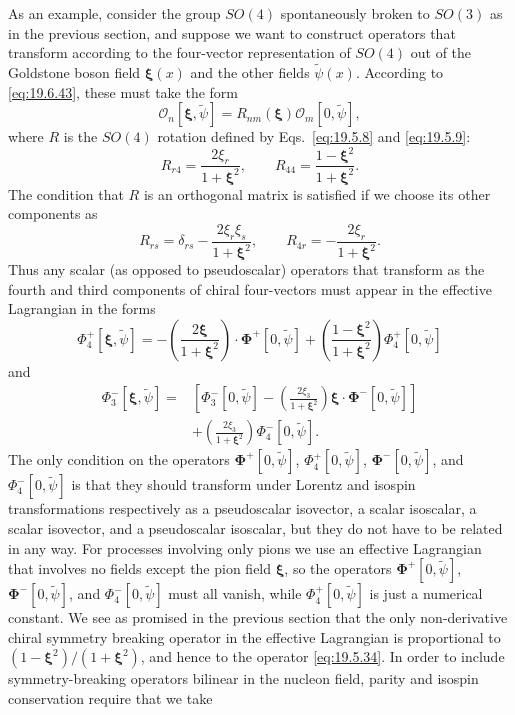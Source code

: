 As an example, consider the group $SO(4)$ spontaneously broken to $SO(3)$ as in the previous section, and suppose we want to construct operators that transform according to the four-vector representation of $SO(4)$ out of the Goldstone boson field $\boldsymbol\xi(x)$ and the other fields $\widetilde\psi(x)$. According to \eqref{eq:19.6.43}, these must take the form
\[
\mathcal O_n[\boldsymbol\xi,\widetilde\psi]
=R_{nm}(\boldsymbol\xi)\mathcal O_m[0,\widetilde\psi],
\]
where $R$ is the $SO(4)$ rotation defined by Eqs.~\eqref{eq:19.5.8} and \eqref{eq:19.5.9}:
\[
R_{r4}=\frac{2\xi_r}{1+\boldsymbol\xi^2},
\qquad
R_{44}=\frac{1-\boldsymbol\xi^2}{1+\boldsymbol\xi^2}.
\]
The condition that $R$ is an orthogonal matrix is satisfied if we choose its other components as
\[
R_{rs}=\delta_{rs}
-\frac{2\xi_r\xi_s}{1+\boldsymbol\xi^2},
\qquad
R_{4r}=-\frac{2\xi_r}{1+\boldsymbol\xi^2}.
\]
Thus any scalar (as opposed to pseudoscalar) operators that transform as the fourth and third components of chiral four-vectors must appear in the effective Lagrangian in the forms
\[
\Phi_4^+[\boldsymbol\xi,\widetilde\psi]
=-\left(\frac{2\boldsymbol\xi}{1+\boldsymbol\xi^2}\right)
\cdot\boldsymbol\Phi^+[0,\widetilde\psi]
+\left(\frac{1-\boldsymbol\xi^2}{1+\boldsymbol\xi^2}\right)
\Phi_4^+[0,\widetilde\psi]
\]
and
\[
\begin{aligned}
\Phi_3^-[\boldsymbol\xi,\widetilde\psi]
={}&\left[
\Phi_3^-[0,\widetilde\psi]
-\left(\frac{2\xi_3}{1+\boldsymbol\xi^2}\right)
\boldsymbol\xi\cdot\boldsymbol\Phi^-[0,\widetilde\psi]
\right]
\\
&+\left(\frac{2\xi_3}{1+\boldsymbol\xi^2}\right)
\Phi_4^-[0,\widetilde\psi].
\end{aligned}
\]
The only condition on the operators $\boldsymbol\Phi^+[0,\widetilde\psi]$, $\Phi_4^+[0,\widetilde\psi]$, $\boldsymbol\Phi^-[0,\widetilde\psi]$, and $\Phi_4^-[0,\widetilde\psi]$ is that they should transform under Lorentz and isospin transformations respectively as a pseudoscalar isovector, a scalar isoscalar, a scalar isovector, and a pseudoscalar isoscalar, but they do not have to be related in any way. For processes involving only pions we use an effective Lagrangian that involves no fields except the pion field $\boldsymbol\xi$, so the operators $\boldsymbol\Phi^+[0,\widetilde\psi]$, $\boldsymbol\Phi^-[0,\widetilde\psi]$, and $\Phi_4^-[0,\widetilde\psi]$ must all vanish, while $\Phi_4^+[0,\widetilde\psi]$ is just a numerical constant. We see as promised in the previous section that the only non-derivative chiral symmetry breaking operator in the effective Lagrangian is proportional to $(1-\boldsymbol\xi^2)/(1+\boldsymbol\xi^2)$, and hence to the operator \eqref{eq:19.5.34}. In order to include symmetry-breaking operators bilinear in the nucleon field, parity and isospin conservation require that we take
